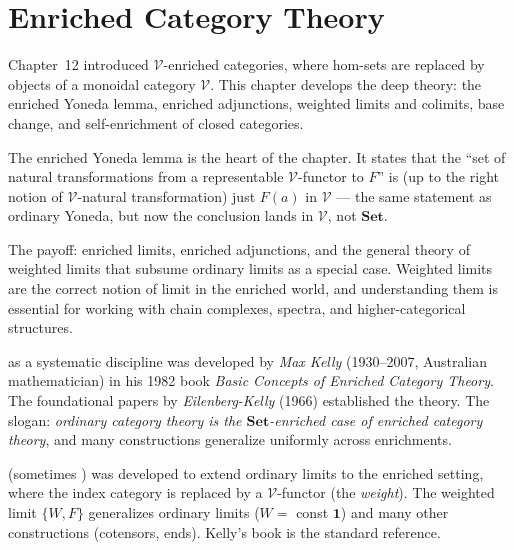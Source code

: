 
\chapter{Enriched Category Theory}

\begin{overviewbox}
Chapter~12 introduced $\mathcal{V}$-enriched categories, where hom-sets are
replaced by objects of a monoidal category $\mathcal{V}$. This chapter develops
the deep theory: the enriched Yoneda lemma, enriched adjunctions, weighted
limits and colimits, base change, and self-enrichment of closed categories.

The enriched Yoneda lemma is the heart of the chapter. It states that the
``set of natural transformations from a representable $\mathcal{V}$-functor to
$F$'' is (up to the right notion of $\mathcal{V}$-natural transformation) just
$F(a)$ in $\mathcal{V}$ --- the same statement as ordinary Yoneda, but now
the conclusion lands in $\mathcal{V}$, not $\mathbf{Set}$.

The payoff: enriched limits, enriched adjunctions, and the general theory of
weighted limits that subsume ordinary limits as a special case. Weighted limits
are the correct notion of limit in the enriched world, and understanding them
is essential for working with chain complexes, spectra, and higher-categorical
structures.
\end{overviewbox}


\begin{nameorigin}
 as a systematic discipline was
developed by \emph{Max Kelly} (1930--2007, Australian mathematician)
in his 1982 book \emph{Basic Concepts of Enriched Category Theory}.
The foundational papers by \emph{Eilenberg-Kelly} (1966) established
the theory. The slogan: \emph{ordinary category theory is the
$\mathbf{Set}$-enriched case of enriched category theory}, and many
constructions generalize uniformly across enrichments.

 (sometimes ) was developed
to extend ordinary limits to the enriched setting, where the index
category is replaced by a $\mathcal{V}$-functor (the \emph{weight}).
The weighted limit $\{W, F\}$ generalizes ordinary limits ($W = $ const
$\mathbf{1}$) and many other constructions (cotensors, ends). Kelly's
book is the standard reference.
\end{nameorigin}

